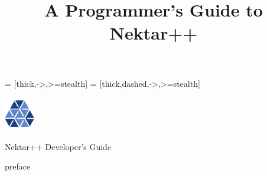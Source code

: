 

\DeclareOldFontCommand{\bf}{\normalfont\bfseries}{\mathbf}

\usepackage{tikz,tikz-3dplot}
\usepackage{subcaption}
\usepackage{algorithm2e}

\usepackage{makeidx}
\usepackage{multirow}
\usepackage{hyperref}
\hypersetup{
    colorlinks=true,
    linkcolor=blue,
    filecolor=magenta,      
    urlcolor=cyan,
}
 
 
 \makeindex

\newcommand\nek{\emph{Nektar++}}
\newcommand\shp{spectral/$hp$}
\newcommand\Shp{Spectral/$hp$}
\newcommand{\GIT}{\textit{git}}
\def\code#1{\texttt{#1}}
\newcommand\hlink{\hyperlink}
\newcommand\htarget{\hypertarget}%
\newcommand{\BM}[1]{\mbox{\boldmath $#1$}}
\newcommand{\BMB}[1]{\mbox{$\mathbb #1$}}

\usepackage{tikz}
\usetikzlibrary{shapes.geometric, arrows, positioning, calc}
\usetikzlibrary{shapes.geometric,arrows,automata}
 = [thick,->,>=stealth]
 = [thick,dashed,->,>=stealth]

\usepackage{standalone}
\usepackage{rotating}

\title{A Programmer's Guide to Nektar++}




\ifdefined\HCode
\begin{center}
    \includegraphics[width=0.1\textwidth]{img/icon-blue.png}
\end{center}
\maketitle
\begin{center}
       \huge{Nektar++ Developer's Guide}
\end{center}
\else
\titlepage
\fi

\clearpage

\ifx\HCode\undefined
\tableofcontents*
\fi
%

{preface}

